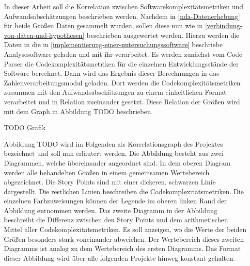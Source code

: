 In dieser Arbeit soll die Korrelation zwischen
Softwarekomplexitätsmetriken und Aufwandsabschätzungen beschrieben
werden. Nachdem in \ref{nda-Datenerhebung} für beide Größen Daten gesammelt wurden, sollen
diese nun wie in \ref{verbindung-von-daten-und-hypothesen} beschrieben ausgewertet werden. Hierzu werden die
Daten in die in \ref{implementierung-einer-untersuchungssoftware} beschriebe Analysesoftware geladen und mit ihr
verarbeitet. Es werden zunächst vom Code Parser die
Codekomplexitätsmetriken für die einzelnen Entwicklungsstände der
Software berechnet. Dann wird das Ergebnis dieser Berechnungen in das
Zahlenverarbeitungsmodul geladen. Dort werden die
Codekomplexitätsmetriken zusammen mit den Aufwandsabschätzungen zu einem
einheitlichen Format verarbeitet und in Relation zueinander gesetzt.
Diese Relation der Größen wird mit dem Graph in Abbildung TODO
beschrieben.

TODO Grafik

Abbildung TODO wird im Folgenden als Korrelationsgraph des Projektes
bezeichnet und soll nun erläutert werden. Die Abbildung besteht aus zwei
Diagrammen, welche übereinander angeordnet sind. In dem oberen Diagram
werden alle behandelten Größen in einem gemeinsamen Wertebereich
abgezeichnet. Die Story Points sind mit einer dickeren, schwarzen Linie
dargestellt. Die restlichen Linien beschreiben die
Codekomplexitätsmetriken. Die einzelnen Farbzuweisungen können der
Legende im oberen linken Rand der Abbildung entnommen werden. Das zweite
Diagramm in der Abbildung beschreibt die Differenz zwischen den Story
Points und dem arithmetischen Mittel aller Codekomplexitätsmetriken. Es
soll anzeigen, wo die Werte der beiden Größen besonders stark
voneinander abweichen. Der Wertebereich dieses zweiten Diagramms ist
analog zu dem Wertebereich des ersten Diagramms. Das Format dieser
Abbildung wird über alle folgenden Projekte hinweg konstant gehalten.

